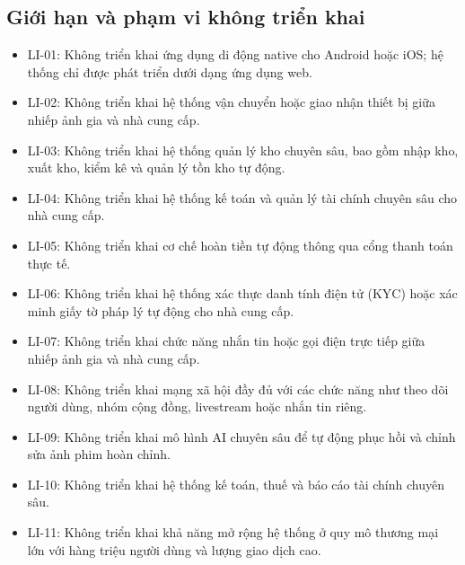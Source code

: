 \subsection{Giới hạn và phạm vi không triển khai}


\begin{itemize}
	\item LI-01: Không triển khai ứng dụng di động native cho Android hoặc iOS; hệ thống chỉ được phát triển dưới dạng ứng dụng web.
	
	\item LI-02: Không triển khai hệ thống vận chuyển hoặc giao nhận thiết bị giữa nhiếp ảnh gia và nhà cung cấp.
	
	\item LI-03: Không triển khai hệ thống quản lý kho chuyên sâu, bao gồm nhập kho, xuất kho, kiểm kê và quản lý tồn kho tự động.
	
	\item LI-04: Không triển khai hệ thống kế toán và quản lý tài chính chuyên sâu cho nhà cung cấp.
	
	\item LI-05: Không triển khai cơ chế hoàn tiền tự động thông qua cổng thanh toán thực tế.
	
	\item LI-06: Không triển khai hệ thống xác thực danh tính điện tử (KYC) hoặc xác minh giấy tờ pháp lý tự động cho nhà cung cấp.
	
	\item LI-07: Không triển khai chức năng nhắn tin hoặc gọi điện trực tiếp giữa nhiếp ảnh gia và nhà cung cấp.
	
	\item LI-08: Không triển khai mạng xã hội đầy đủ với các chức năng như theo dõi người dùng, nhóm cộng đồng, livestream hoặc nhắn tin riêng.
	
	\item LI-09: Không triển khai mô hình AI chuyên sâu để tự động phục hồi và chỉnh sửa ảnh phim hoàn chỉnh.
	
	\item LI-10: Không triển khai hệ thống kế toán, thuế và báo cáo tài chính chuyên sâu.
	
	\item LI-11: Không triển khai khả năng mở rộng hệ thống ở quy mô thương mại lớn với hàng triệu người dùng và lượng giao dịch cao.
\end{itemize}
